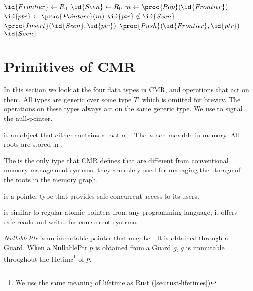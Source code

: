 \begin{codebox}
\li $\id{Frontier} \gets R_0$
\li $\id{Seen} \gets R_0$
\li \While $m \gets \proc{Pop}(\id{Frontier})$
\li   \Do \For $\id{ptr} \gets \proc{Pointers}(m)$
\li     \Do \If $\id{ptr} \notin \id{Seen}$
\li         \Do
            $\proc{Insert}(\id{Seen}, \id{ptr})$
\li	  		  $\proc{Push}(\id{Frontier}, \id{ptr})$
            \End
        \End
      \End
\li \Return $\id{Seen}$
\end{codebox}

\section{Primitives of CMR\label{sec:cmr-primitives}}

In this section we look at the four data types in CMR, and operations that act on them. All types
are generic over some type $T$, which is omitted for brevity. The operations on these types 
always act on the same generic type. We use \nullptr to signal the null-pointer.

\begin{definition}
   is an object that either contains a root or \nullptr. The  is non-movable
  in memory. All roots are stored in .
\end{definition}

The  is the only type that CMR defines that are different from conventional memory
management systems; they are solely used for managing the storage of the roots in the memory graph.

\begin{definition}
   is a pointer type that provides safe concurrent access to its users.
\end{definition}

 is similar to regular atomic pointers from any programming language; it offers safe
reads and writes for concurrent systems.

\begin{definition}
  \emph{NullablePtr} is an immutable pointer that may be \nullptr. It is obtained through a Guard.
  When a NullablePtr $p$ is obtained from a Guard $g$, $g$ is immutable throughout the
  lifetime\footnote{We use the same meaning of lifetime as Rust (\cref{sec:rust-lifetimes})}
  of $p$.
\end{definition}

